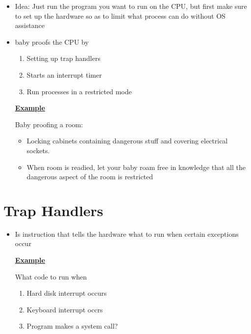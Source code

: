 \documentclass[12pt]{article}
\begin{document}
\begin{itemize}
    \item Idea: Just run the program you want to run on the CPU,
    but first make sure to set up the hardware so as to limit what
    process can do without OS assistance
    \item baby proofs the CPU by

    \bigskip

    \begin{enumerate}[1.]
        \item Setting up trap handlers
        \item Starts an interrupt timer
        \item Run processes in a restricted mode
    \end{enumerate}

    \bigskip

    \underline{\textbf{Example}}

    \bigskip

    Baby proofing a room:

    \bigskip

    \begin{itemize}
        \item Locking cabinets containing dangerous stuff and covering electrical sockets.
        \item When room is readied, let your baby roam free in knowledge that all the dangerous
        aspect of the room is restricted
    \end{itemize}
\end{itemize}

\section*{Trap Handlers}

\begin{itemize}
    \item Is instruction that tells the hardware what to run when certain exceptions occur

    \bigskip

    \underline{\textbf{Example}}

    \bigskip

    What code to run when

    \begin{enumerate}[1.]
        \item Hard disk interrupt occurs
        \item Keyboard interrupt occrs
        \item Program makes a system call?
    \end{enumerate}

\end{itemize}
\end{document}

